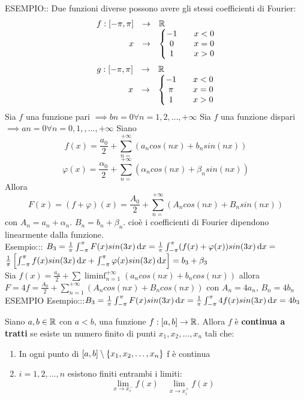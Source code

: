 ESEMPIO:: Due funzioni diverse possono avere gli stessi coefficienti di Fourier:
\[\begin{array}{rcl} f: \left[-\pi,\pi\right] & \to &  \mathbb{R} \\
x & \to & \left\{\begin{matrix} -1 && x<0\\0&&x= 0\\1&&x>0 \end{matrix}\right.\end{array}\]
\[\begin{array}{rcl} g: \left[-\pi,\pi\right] & \to &  \mathbb{R} \\
x & \to & \left\{\begin{matrix} -1 && x<0\\\pi&&x= 0\\1&&x>0 \end{matrix}\right.\end{array}\]
\observation
Sia $f$ una funzione pari $\implies bn=0 \forall n=1,2,\dotsc,+\infty$
\observation
Sia $f$ una funzione dispari $\implies an=0 \forall n=0,1,,\dotsc,+\infty$
\observation
Siano
\[f(x)=\frac{a_0}{2}+\sum\limits_{n=}^{+\infty}\left(a_n cos(nx)+b_n sin(nx)\right)\]
\[\varphi(x)=\frac{\alpha_0}{2}+\sum\limits_{n=}^{+\infty}\left(\alpha_ncos(nx)+\beta_nsin(nx)\right)\]
Allora
\[ F(x)=(f+\varphi)(x)=\frac{A_0}{2}+\sum\limits_{n=}^{+\infty}\left(A_n cos(nx)+B_n sin(nx)\right)\]
con $A_n=a_n+\alpha_n$. $B_n=b_n+\beta_n$.
cioè i coefficienti di Fourier dipendono linearmente dalla funzione.\\
Esempio::: $B_3=\frac{1}{\pi}\int_{-\pi}^{\pi}F(x)sin(3x)\,\mathrm{d}{x}=\frac{1}{\pi}\int_{-\pi}^{\pi}(f(x)+\varphi(x))sin(3x)\,\mathrm{d}{x}=$\\
$\frac{1}{\pi}\left[\int_{-\pi}^{\pi}f(x)sin(3x)\,\mathrm{d}{x}+\int_{-\pi}^{\pi}\varphi(x)sin(3x)\,\mathrm{d}{x}\right]=b_3+\beta_3$\\
Sia $f(x)=\frac{a_0}{2}+\sum\liminf_{n=1}^{+\infty}\left(a_ncos(nx)+b_ncos(nx)\right)$ allora $F=4f=\frac{A_0}{2}+\sum\limits_{n=1}^{+\infty}\left(A_ncos(nx)+B_ncos(nx)\right)$ con $A_n=4a_n$, $B_n=4b_n$\\
ESEMPIO
Esempio:::$B_3=\frac{1}{\pi}\int_{-\pi}^{\pi}F(x)sin(3x)\,\mathrm{d}{x}=\frac{1}{\pi}\int_{-\pi}^{\pi}4f(x)sin(3x)\,\mathrm{d}{x}=4b_3$\\
\begin{definition}
	Siano $a,b\in \mathbb{R}$ con $a<b$, una funzione $f:\left[a,b\right] \to \mathbb{R}$. Allora $f$ è \textbf{continua a tratti} se esiste un numero finito di punti $x_1,x_2,\dotsc,x_n$ tali che:
	\begin{enumerate}
		\item In ogni punto di $\left[a,b\right]\setminus\left\{x_1,x_2,\dotsc,x_n\right\}$ f è continua
		\item $i=1,2,\dotsc,n$ esistono finiti entrambi i limiti:
		\[\lim\limits_{x\to x_i^{-}}f(x)\quad \lim\limits_{x\to x_i^{+}}f(x)\]
	\end{enumerate}
\end{definition}

